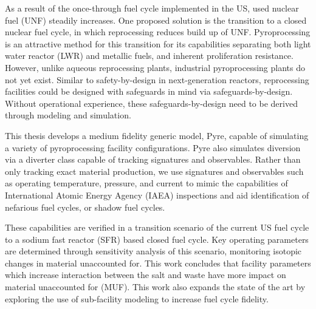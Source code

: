 \vspace{-0.4in}

As a result of the once-through fuel cycle implemented in the US, used nuclear fuel (UNF) steadily increases. One proposed solution is the transition to a closed nuclear fuel cycle, in which reprocessing reduces build up of UNF. Pyroprocessing is an attractive method for this transition for its capabilities separating both light water reactor (LWR) and metallic fuels, and inherent proliferation resistance. However, unlike aqueous reprocessing plants, industrial pyroprocessing plants do not yet exist. Similar
to safety-by-design in next-generation reactors, reprocessing facilities could be designed with safeguards in mind via safeguards-by-design. Without operational experience, these safeguards-by-design need to be derived through modeling and simulation. 

This thesis develops a medium fidelity generic model, Pyre, capable of simulating a variety of pyroprocessing facility configurations. Pyre also simulates diversion via a diverter class capable of tracking signatures and observables. Rather than only tracking exact material production, we use signatures and observables such as operating temperature, pressure, and current to mimic the capabilities of International Atomic Energy Agency (IAEA) inspections and aid identification of nefarious fuel cycles, or shadow fuel cycles.

These capabilities are verified in a transition scenario of the current US fuel cycle to a sodium fast reactor (SFR) based closed fuel cycle. Key operating parameters are determined through
sensitivity analysis of this scenario, monitoring isotopic changes in material unaccounted for. This work concludes that facility parameters which increase interaction between the salt and waste have more impact on material unaccounted for (MUF). This work also expands the state of the art by exploring the use of sub-facility modeling to increase fuel cycle fidelity.
